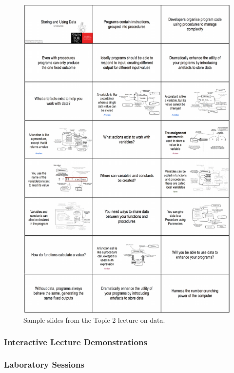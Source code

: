 \begin{figure}[htbp]
	\centering
	\includegraphics[width=\textwidth]{Lecture}
	\caption{Sample slides from the Topic 2 lecture on data.}
	\label{fig:lecture}
\end{figure}


\subsubsection{Interactive Lecture Demonstrations} %
\label{ssub:interactive_lecture_demonstrations}



\subsubsection{Laboratory Sessions} %
\label{ssub:laboratory_sessions}

